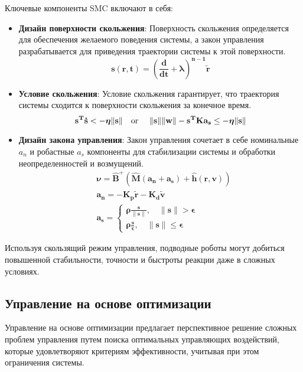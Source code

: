     Ключевые компоненты SMC включают в себя:
    \begin{itemize}
        \item \textbf{Дизайн поверхности скольжения}: Поверхность скольжения определяется для обеспечения желаемого поведения системы, а закон управления разрабатывается для приведения траектории системы к этой поверхности.
        \begin{equation*}
            \mathbf{s(r, t) = (\frac{d}{dt} + \boldsymbol{\lambda})^{n-1}\tilde{{r}}}
        \end{equation*}
        \item \textbf{Условие скольжения}: Условие скольжения гарантирует, что траектория системы сходится к поверхности скольжения за конечное время.
        \begin{equation*}
            \mathbf{s^T\dot{s} < - \boldsymbol{\eta} \|s\| \text{\quad or \quad} \|s\|\|w\| - s^TKa_s \leq - \boldsymbol{\eta} \|s\|}
        \end{equation*}
        \item \textbf{Дизайн закона управления}: Закон управления сочетает в себе номинальные $a_n$ и робастные $a_s$ компоненты для стабилизации системы и обработки неопределенностей и возмущений.
        \begin{align*} 
            &\mathbf{\boldsymbol{\nu} = \hat{B}^{+}(\hat{M}(a_n + a_s) + \hat h(r, v))} \\
            &\mathbf{a_n = - K_p\tilde{r} - K_d\tilde{v}} \\
            &\mathbf{a_s = 
            \begin{cases}
            \mathbf{\boldsymbol{\rho} \frac{s}{\|s\|}, \quad \|s\| >\boldsymbol{\epsilon}}\\
            \mathbf{\boldsymbol{\rho} \frac{s}{\boldsymbol{\epsilon}}, \quad \|s\| \leq \boldsymbol{\epsilon}}
            \end{cases}}
        \end{align*}
    \end{itemize}

    Используя скользящий режим управления, подводные роботы могут добиться повышенной стабильности, точности и быстроты реакции даже в сложных условиях.

\subsection{Управление на основе оптимизации}

    Управление на основе оптимизации предлагает перспективное решение сложных проблем управления путем поиска оптимальных управляющих воздействий, которые удовлетворяют критериям эффективности, учитывая при этом ограничения системы.


